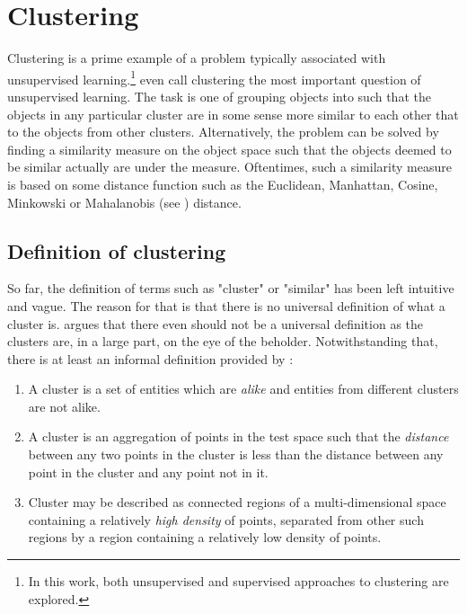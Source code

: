 \chapter{Clustering}\label{chap:clustering}

Clustering is a prime example of a problem typically associated with unsupervised learning.\footnote{In this work, both unsupervised and supervised approaches to clustering are explored.} \cite{xu_comprehensive_2015} even call clustering the most important question of unsupervised learning. The task is one of grouping objects into  such that the objects in any particular cluster are in some sense more similar to each other that to the objects from other clusters. Alternatively, the problem can be solved by finding a similarity measure on the object space such that the objects deemed to be similar actually are under the measure. Oftentimes, such a similarity measure is based on some distance function such as the Euclidean, Manhattan, Cosine, Minkowski or Mahalanobis (see \cite{mahalanobis_generalised_1936}) distance.

\section{Definition of clustering}
So far, the definition of terms such as "cluster" or "similar" has been left intuitive and vague. The reason for that is that there is no universal definition of what a cluster is. \cite{estivill-castro_why_2002} argues that there even should not be a universal definition as the clusters are, in a large part, on the eye of the beholder. Notwithstanding that, there is at least an informal definition provided by \cite{jain_algorithms_1988}:

\begin{enumerate}
	\item A cluster is a set of entities which are \textit{alike} and entities from different clusters are not alike.
	\item A cluster is an aggregation of points in the test space such that the \textit{distance} between any two points in the cluster is less than the distance between any point in the cluster and any point not in it.
	\item Cluster may be described as connected regions of a multi-dimensional space containing a relatively \textit{high density} of points, separated from other such regions by a region containing a relatively low density of points.
\end{enumerate}

